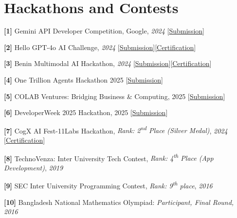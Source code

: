 \documentclass[10pt,letterpaper]{article}
\newcommand{\lk}[2]{[\href{#1}{#2}]}
\begin{document}
\section{Hackathons and Contests}
\textbf{[1]} Gemini API Developer Competition, Google, \textit{2024} \lk{https://ai.google.dev/competition/projects/guaridan-ai?hl=en}{Submission}\par
\textbf{[2]} Hello GPT-4o AI Challenge, \textit{2024} \lk{https://lablab.ai/event/hello-gpt-4o-ai-challenge/scholarintel/scholarintel-intel-decision-making-for-scholar}{Submission}\lk{https://lablab.ai/u/@imsanjoykb/clxuej7nk000a7470txztkzf9}{Certification}\par
\textbf{[3]} Benin Multimodal AI Hackathon, \textit{2024} \lk{https://lablab.ai/event/benin-multimodal-ai-hackathon/sanjoy-kumar/vocalytics-intelligence-speech-transformation}{Submission}\lk{https://lablab.ai/u/@imsanjoykb/clxaxqk7i002e74gergit5pwp}{Certification}\par
\textbf{[4]} One Trillion Agents Hackathon 2025 \lk{https://devpost.com/software/marketiq-amplify-marketing-brainpower-dhaj9q\#updates}{Submission}\par
\textbf{[5]} COLAB Ventures: Bridging Business \& Computing, 2025 \lk{https://devpost.com/software/marketiq-amplify-marketing-brainpower-ul79r5?ref_content=my-projects-tab&ref_feature=my_projects}{Submission}\par
\textbf{[6]} DeveloperWeek 2025 Hackathon, 2025 \lk{https://devpost.com/software/space-agent?ref_content=my-projects-tab&ref_feature=my_projects}{Submission}\par
\textbf{[7]} CogX AI Fest-11Labs Hackathon, \textit{Rank: 2\textsuperscript{nd} Place (Silver Medal)}, \textit{2024} \lk{https://lablab.ai/u/@imsanjoykb/clvwfkb7y000f13tzek3obwoy}{Certification}\par
\textbf{[8]} TechnoVenza: Inter University Tech Contest, \textit{Rank: 4\textsuperscript{th} Place (App Development)}, \textit{2019}\par
\textbf{[9]} SEC Inter University Programming Contest, \textit{Rank: 9\textsuperscript{th} place}, \textit{2016}\par
\textbf{[10]} Bangladesh National Mathematics Olympiad: \textit{Participant, Final Round, 2016}\par

\end{document}
